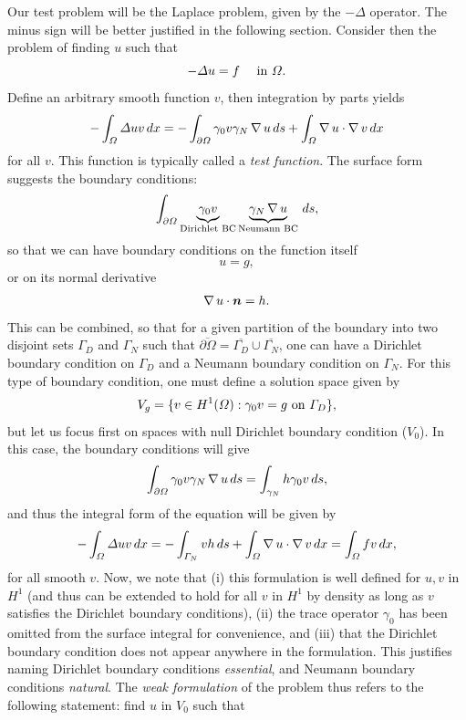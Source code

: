 Our test problem will be the Laplace problem, given by the $-\Delta$ operator. The minus sign will be better justified in the following section. Consider then the problem of finding $u$ such that 
\begin{equation}
    -\Delta u = f \quad \text{ in }\Omega.
\end{equation}
Define an arbitrary smooth function $v$, then integration by parts yields
\begin{equation}\label{eq:ibp-poisson}
    - \int_\Omega \Delta u v\,dx = -\int_{\partial\Omega}\gamma_0 v \gamma_N \operatorname{\nabla} u \,ds + \int_\Omega \operatorname{\nabla} u \cdot \operatorname{\nabla} v\,dx
\end{equation}
for all $v$. This function is typically called a \emph{test function}. The surface form suggests the boundary conditions: 
\begin{equation}
    \int_{\partial\Omega}\underbrace{\gamma_0 v}_\text{Dirichlet BC} \underbrace{\gamma_N \operatorname{\nabla} u}_\text{Neumann BC} \,ds,
\end{equation}
so that we can have boundary conditions on the function itself  
\begin{equation*}
    u = g,
\end{equation*}
or on its normal derivative
\begin{equation*}
    \grad u \cdot \vec n = h.
\end{equation*}
This can be combined, so that for a given partition of the boundary into two disjoint sets $\Gamma_D$ and $\Gamma_N$ such that $\overline{\partial\Omega} = \overline{\Gamma_D}\cup\overline{\Gamma_N}$, one can have a Dirichlet boundary condition on $\Gamma_D$ and a Neumann boundary condition on $\Gamma_N$. For this type of boundary condition, one must define a solution space given by 
\begin{equation}
    V_g = \{v \in H^1(\Omega): \gamma_0 v = g \text{ on }\Gamma_D\},
\end{equation}
but let us focus first on spaces with null Dirichlet boundary condition ($V_0$). In this case, the boundary conditions will give
\begin{equation*}
    \int_{\partial\Omega}\gamma_0 v \gamma_N \operatorname{\nabla} u\,ds = \int_{\gamma_N} h \gamma_0 v\,ds,
\end{equation*}
and thus the integral form of the equation will be given by
\begin{equation*}
    -\int_\Omega\Delta u v\,dx = -\int_{\Gamma_N}v h\,ds + \int_\Omega \operatorname{\nabla} u \cdot \operatorname{\nabla} v\,dx = \int_\Omega f v\,dx,
\end{equation*}
for all smooth $v$. Now, we note that (i) this formulation is well defined for $u,v$ in $H^1$ (and thus can be extended to hold for all $v$ in $H^1$ by density as long as $v$ satisfies the Dirichlet boundary conditions), (ii) the trace operator $\gamma_0$ has been omitted from the surface integral for convenience, and (iii) that the Dirichlet boundary condition does not appear anywhere in the formulation. This justifies naming Dirichlet boundary conditions \emph{essential}, and Neumann boundary conditions \emph{natural}. The \emph{weak formulation} of the problem thus refers to the following statement: find $u$ in $V_0$ such that
